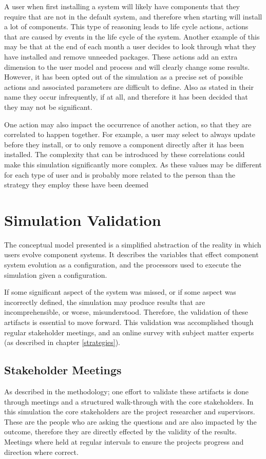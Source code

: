 A user when first installing a system will likely have components that they require that are not in the default system, and therefore when starting will install a lot of components.
This type of reasoning leads to life cycle actions, actions that are caused by events in the life cycle of the system.
Another example of this may be that at the end of each month a user decides to look through what they have installed and remove unneeded packages.
These actions add an extra dimension to the user model and process and will clearly change some results.
However, it has been opted out of the simulation as a precise set of possible actions and associated parameters are difficult to define.
Also as stated in their name they occur infrequently, if at all, and therefore it has been decided that they may not be significant.  

One action may also impact the occurrence of another action, so that they are correlated to happen together.
For example, a user may select to always update before they install, or to only remove a component directly after it has been installed.
The complexity that can be introduced by these correlations could make this simulation significantly more complex.
As these values may be different for each type of user and is probably more related to the person than the strategy they employ these have been deemed 



\section{Simulation Validation}
The conceptual model presented is a simplified abstraction of the reality in which users evolve component systems.
It describes the variables that effect component system evolution as a configuration,
and the processors used to execute the simulation given a configuration.

If some significant aspect of the system was missed, or if some aspect was incorrectly defined, the simulation may produce results that are incomprehensible,
or worse, misunderstood.
Therefore, the validation of these artifacts is essential to move forward. 
This validation was accomplished though regular stakeholder meetings, and an online survey with subject matter experts (as described in chapter \ref{strategies}).

\subsection{Stakeholder Meetings}
As described in the methodology; one effort to validate these artifacts is done through meetings and a structured walk-through with the core stakeholders.
In this simulation the core stakeholders are the project researcher and supervisors.
These are the people who are asking the questions and are also impacted by the outcome, therefore they are directly effected by the validity of the results.
Meetings where held at regular intervals to ensure the projects progress and direction where correct.

